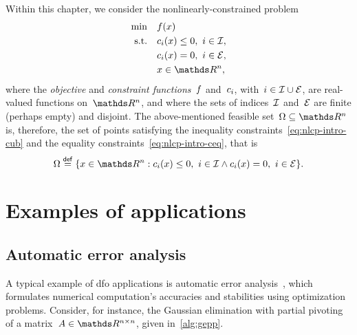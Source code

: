 Within this chapter, we consider the nonlinearly-constrained problem
\begin{subequations}
    \label{eq:nlcp-intro}
    \begin{align}
        \min        & \quad \obj(x)\\
        \text{s.t.} & \quad \con{i}(x) \le 0, ~ i \in \iub, \label{eq:nlcp-intro-cub}\\
                    & \quad \con{i}(x) = 0, ~ i \in \ieq, \label{eq:nlcp-intro-ceq}\\
                    & \quad x \in \R^n, \nonumber
    \end{align}
\end{subequations}
where the \emph{objective} and \emph{constraint functions}~$f$ and~$c_{i}$, with~$i \in \mathcal{I} \cup \mathcal{E}$, are real-valued functions on~$\R^n$, and where the sets of indices~$\mathcal{I}$ and~$\mathcal{E}$ are finite (perhaps empty) and disjoint.
The above-mentioned feasible set~$\Omega \subseteq \R^n$ is, therefore, the set of points satisfying the inequality constraints~\cref{eq:nlcp-intro-cub} and the equality constraints~\cref{eq:nlcp-intro-ceq}, that is
\begin{equation*}
    \Omega \eqdef \set{x \in \R^n : \con{i}(x) \le 0, ~ i \in \iub \land \con{i}(x) = 0, ~ i \in \ieq}.
\end{equation*}

\section{Examples of applications}

\subsection{Automatic error analysis}

A typical example of \gls{dfo} applications is automatic error analysis~\cite{Higham_1993,Higham_2002}, which formulates numerical computation's accuracies and stabilities using optimization problems.
Consider, for instance, the Gaussian elimination with partial pivoting of a matrix~$A \in \R^{n \times n}$, given in~\cref{alg:gepp}.

